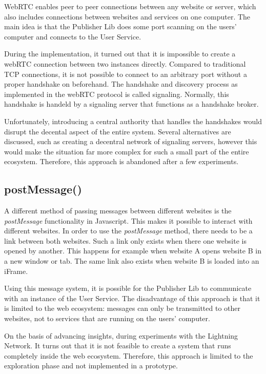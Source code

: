 WebRTC enables peer to peer connections between any website or server, which also includes connections between websites and services on one computer. The main idea is that the Publisher Lib does some port scanning on the users' computer and connects to the User Service.

During the implementation, it turned out that it is impossible to create a webRTC connection between two instances directly. Compared to traditional TCP connections, it is not possible to connect to an arbitrary port without a proper handshake on beforehand. The handshake and discovery process as implemented in the webRTC protocol is called signaling. Normally, this handshake is handeld by a signaling server that functions as a handshake broker.

Unfortunately, introducing a central authority that handles the handshakes would disrupt the decental aspect of the entire system. Several alternatives are discussed, such as creating a decentral network of signaling servers, however this would make the situation far more complex for such a small part of the entire ecosystem. Therefore, this approach is abandoned after a few experiments.

\subsection{postMessage()}
A different method of passing messages between different websites is the \textit{postMessage} functionality in Javascript. This makes it possible to interact with different websites. In order to use the \textit{postMessage} method, there needs to be a link between both websites. Such a link only exists when there one website is opened by another. This happens for example when website A opens website B in a new window or tab. The same link also exists when website B is loaded into an iFrame. 

Using this message system, it is possible for the Publisher Lib to communicate with an instance of the User Service. The disadvantage of this approach is that it is limited to the web ecosystem: messages can only be transmitted to other websites, not to services that are running on the users' computer. 

On the basis of advancing insights, during experiments with the Lightning Network. It turns out that it is not feasible to create a system that runs completely inside the web ecosystem. Therefore, this approach is limited to the exploration phase and not implemented in a prototype.

